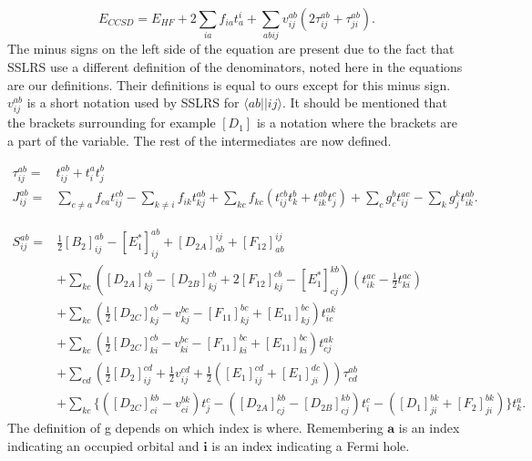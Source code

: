 \documentclass[a4paper,norsk,11pt,twoside]{report}
\begin{document}
\begin{equation}
E_{CCSD} = E_{HF} + 2\sum_{ia} f_{ia} t_a^i 
+ \sum_{abij} v_{ij}^{ab} ( 2 \tau_{ij}^{ab}
+ \tau_{ji}^{ab} ) . \label{SSRS3}
\end{equation}
The minus signs on the left side of the equation are present due to the fact that SSLRS use a different definition of the denominators, noted here in the equations are our definitions. Their definitions is equal to ours except for this minus sign. \\

$v_{ij}^{ab}$ is a short notation used by SSLRS for $\langle ab || ij \rangle$. It should be mentioned that the brackets surrounding for example $[D_1]$ is a notation where the brackets are a part of the variable. The rest of the intermediates are now defined.

\begin{align}
\tau_{ij}^{ab} = & t_{ij}^{ab} + t_i^a t_j^b
\\ 
J_{ij}^{ab} = &
\sum_{c \not= a} f_{ca} t_{ij}^{cb}
- \sum_{k \not= i} f_{ik} t_{kj}^{ab}
+ \sum_{kc} f_{kc} (t_{ij}^{cb} t_k^b + t_{ik}^{ab} t_j^c )
+ \sum_c g_c^b t_{ij}^{ac} - \sum_k g_j^k t_{ik}^{ab} .
\end{align}

\begin{align}
S_{ij}^{ab} = & 
\frac{1}{2} [B_2]_{ij}^{ab}
- [E_1^*]_{ij}^{ab}
+ [D_{2A}]_{ab}^{ij}
+ [F_{12}]_{ab}^{ij} 
 \\ &
+ \sum_{kc} (
[D_{2A}]_{kj}^{cb} - [D_{2B}]_{kj}^{cb}
+ 2[F_{12}]_{kj}^{cb}
- [E_1^*]_{cj}^{kb} )
( t_{ik}^{ac} - \frac{1}{2} t_{ki}^{ac} )
\nonumber \\ &
+ \sum_{kc} (\frac{1}{2} [D_{2C}]_{kj}^{cb}
- v_{kj}^{bc} - [F_{11}]_{kj}^{bc} + [E_{11}]_{kj}^{bc}) t_{ic}^{ak}
\nonumber \\ &
+ \sum_{kc} (\frac{1}{2} [D_{2C}]_{ki}^{cb} - v_{ki}^{bc} - [F_{11}]_{ki}^{bc} 
+ [E_{11}]_{ki}^{bc} ) t_{cj}^{ak}
\nonumber \\ &
+ \sum_{cd} ( \frac{1}{2} [D_2]_{ij}^{cd} 
+ \frac{1}{2} v_{ij}^{cd} + \frac{1}{2} (
[E_1]_{ij}^{cd} + [E_1]_{ji}^{dc}))
\tau_{cd}^{ab}
\nonumber \\ &
+ \sum_{kc} \{
([D_{2C}]_{ci}^{kb} - v_{ci}^{bk}) t_j^c
- ([D_{2A}]_{cj}^{kb} 
- [D_{2B}]_{cj}^{kb} ) t_i^c
- ([D_1]_{ji}^{bk} + [F_2]_{ji}^{bk}) \} t_k^a .
\nonumber
\end{align}
The definition of g depends on which index is where. Remembering $\textbf{a}$ is an index indicating an occupied orbital and $\textbf{i}$ is an index indicating a Fermi hole.
\end{document}
